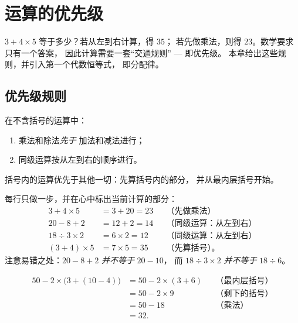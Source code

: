 \chapter{运算的优先级}\label{ch:g7:priorities}

$3 + 4 \times 5$ 等于多少？若从左到右计算，得 $35$；
若先做乘法，则得 $23$。数学要求只有一个答案，
因此计算需要一套“交通规则” --- 即优先级。
本章给出这些规则，并引入第一个代数恒等式，
即分配律。

\section{优先级规则}

\begin{theorem}[优先级规则]\label{thm:g7:priorities:rules}
在不含括号的运算中：
\begin{enumerate}
  \item 乘法和除法\emph{先于}
        加法和减法进行；
  \item 同级运算按从左到右的顺序进行。
\end{enumerate}
括号内的运算优先于其他一切：先算括号内的部分，
并从最内层括号开始。
\end{theorem}

\begin{example}\label{ex:g7:priorities:basic}
每行只做一步，并在心中标出当前计算的部分：
\begin{align*}
3 + 4 \times 5 &= 3 + 20 = 23
&&\text{（先做乘法）}\\
20 - 8 + 2 &= 12 + 2 = 14
&&\text{（同级运算：从左到右）}\\
18 \div 3 \times 2 &= 6 \times 2 = 12
&&\text{（同级运算：从左到右）}\\
(3 + 4) \times 5 &= 7 \times 5 = 35
&&\text{（先算括号）。}
\end{align*}
注意易错之处：$20 - 8 + 2$ \emph{并不等于} $20 - 10$，
而 $18 \div 3 \times 2$ \emph{并不等于} $18 \div 6$。
\end{example}

\begin{example}[多层括号]\label{ex:g7:priorities:nested}
\begin{align*}
50 - 2 \times \bigl(3 + (10 - 4)\bigr)
&= 50 - 2 \times (3 + 6) && \text{（最内层括号）}\\
&= 50 - 2 \times 9 && \text{（剩下的括号）}\\
&= 50 - 18 && \text{（乘法）}\\
&= 32 .
\end{align*}
\end{example}

